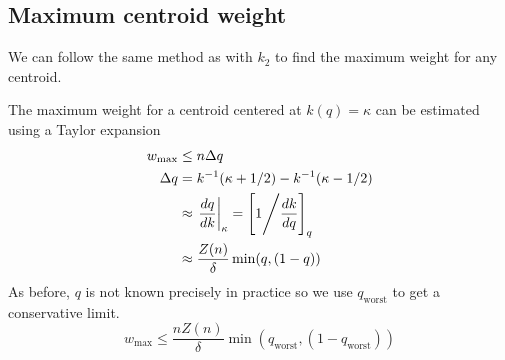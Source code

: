 \documentclass[11pt]{amsart}
\begin{document}
\subsection{Maximum centroid weight}
We can follow the same method as with $k_2$ to find the maximum weight for any centroid.

The maximum weight for a centroid centered at $k(q) = \kappa$ can be estimated using a Taylor expansion
\[
\begin{aligned}
w_{\max} &\le n \Delta q \\
\Delta q &= k^{-1}(\kappa + 1/2) - k^{-1}(\kappa-1/2) \\
&\approx \left . \frac {dq} {dk} \right\rvert_{\kappa} = \left[ 1 \Bigg \slash {\frac {dk} {dq}} \right]_q\\
&\approx \frac {Z(n)} \delta \min (q, (1-q)) \\
\end{aligned}
\]
As before, $q$ is not known precisely in practice so we use $q_{\text {worst}}$ to get a conservative limit.
\[
w_{\max}\le \frac {nZ(n)} \delta \min (q_{\text{worst}}, (1-q_{\text{worst}})) 
\]

{}
\end{document}
